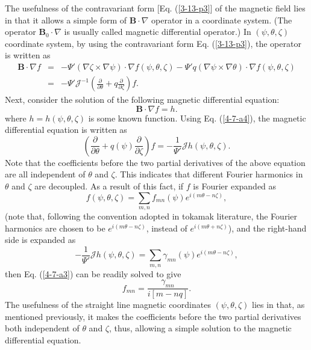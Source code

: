 \documentclass{llncs}
\begin{document}
The usefulness of the contravariant form [Eq. (\ref{3-13-p3}] of the magnetic
field lies in that it allows a simple form of $\mathbf{B} \cdot \nabla$
operator in a coordinate system. (The operator $\mathbf{B}_0 \cdot \nabla$ is
usually called magnetic differential operator.) In $(\psi, \theta, \zeta)$
coordinate system, by using the contravariant form Eq. (\ref{3-13-p3}), the
operator is written as
\begin{eqnarray}
  \mathbf{B} \cdot \nabla f & = & - \Psi' (\nabla \zeta \times \nabla \psi)
  \cdot \nabla f (\psi, \theta, \zeta) - \Psi' q (\nabla \psi \times \nabla
  \theta) \cdot \nabla f (\psi, \theta, \zeta) \nonumber\\
  & = & - \Psi' \mathcal{J}^{- 1} \left( \frac{\partial}{\partial \theta} + q
  \frac{\partial}{\partial \zeta} \right) f.  \label{4-7-a4}
\end{eqnarray}
Next, consider the solution of the following magnetic differential equation:
\begin{equation}
  \label{17-4-27-1} \mathbf{B} \cdot \nabla f = h.
\end{equation}
where $h = h (\psi, \theta, \zeta)$ is some known function. Using Eq.
(\ref{4-7-a4}), the magnetic differential equation is written as
\begin{equation}
  \label{4-7-a3} \left( \frac{\partial}{\partial \theta} + q (\psi)
  \frac{\partial}{\partial \zeta} \right) f = - \frac{1}{\Psi'} \mathcal{J}h
  (\psi, \theta, \zeta) .
\end{equation}
Note that the coefficients before the two partial derivatives of the above
equation are all independent of $\theta$ and $\zeta$. This indicates that
different Fourier harmonics in $\theta$ and $\zeta$ are decoupled. As a result
of this fact, if $f$ is Fourier expanded as
\begin{equation}
  f (\psi, \theta, \zeta) = \sum_{m, n} f_{m n} (\psi) e^{i (m \theta - n
  \zeta)},
\end{equation}
(note that, following the convention adopted in tokamak
literature{\cite{cheng1987}}, the Fourier harmonics are chosen to be $e^{i (m
\theta - n \zeta)}$, instead of $e^{i (m \theta + n \zeta)}$), and the
right-hand side is expanded as
\begin{equation}
  - \frac{1}{\Psi'} \mathcal{J}h (\psi, \theta, \zeta) = \sum_{m, n} \gamma_{m
  n} (\psi) e^{i (m \theta - n \zeta)},
\end{equation}
then Eq. (\ref{4-7-a3}) can be readily solved to give
\begin{equation}
  \label{10-6-e1} f_{m n} = \frac{\gamma_{m n}}{i [m - n q]} .
\end{equation}
The usefulness of the straight line magnetic coordinates $(\psi, \theta,
\zeta)$ lies in that, as mentioned previously, it makes the coefficients
before the two partial derivatives both independent of $\theta$ and $\zeta$,
thus, allowing a simple solution to the magnetic differential equation.
\end{document}
